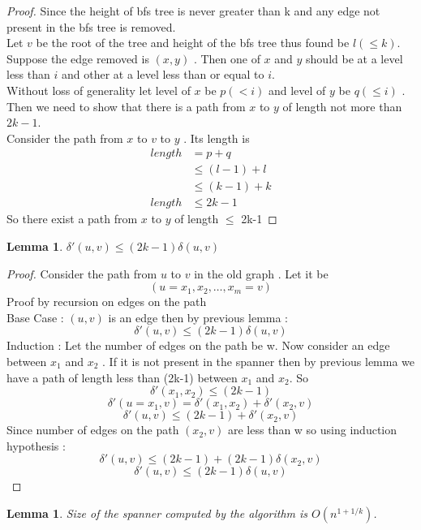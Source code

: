 \documentclass[11pt]{article}
\newtheorem{lemma}[theorem]{Lemma}
\begin{document}
\begin{proof}
Since the height of bfs tree is never greater than k and any edge not present in the bfs tree is removed. \\
Let $v$ be the root of the tree and height of the bfs tree thus found be $l (\leq k)$.	 \\
Suppose the edge removed is $(x,y)$ . Then one of $x$ and $y$ should be at a level less than $i$ and other at a level less than or equal to $i$.\\
Without loss of generality let  level of $x$ be $p(< i)$ and level of $y$ be $q(\leq i)$ .  Then we need to show that there is a path from $x$ to $y$ of length not more than $2k-1$. \\
Consider the path from $x$ to $v$ to $y$ . Its length is 
\begin{align*}
length &= p+q \\
	&\leq (l-1) + l \\
	&\leq (k-1) + k \\
length	&\leq 2k -1
\end{align*}
So there exist a path from $x$ to $y$ of length $\leq$ 2k-1
\end{proof}
\begin{lemma} $\delta'(u,v) \le (2k-1) \delta(u,v) $
\end{lemma}
\begin{proof}
Consider the path from $u$ to $v$ in the old graph . Let it be 
\[ (u=x_1 , x_2 , \ldots , x_m=v)
\]
Proof by recursion on edges on the path \\
Base Case : $(u,v)$ is an edge then by previous lemma :
\[
\delta'(u,v) \leq (2k-1) \delta(u,v) 
\]
Induction : 
Let the number of edges on the path be w.
Now consider an edge between $x_1$ and $x_2$ . If it is not present in the spanner then by previous lemma we have a path of length less than (2k-1) between $x_1$ and $x_2$.  So 
\[\delta'(x_1,x_2) \leq (2k-1)
\]
\[
\delta'(u=x_1,v) = \delta'(x_1,x_2) +   \delta'(x_{2},v)
\]
\[
\delta'(u,v) \leq (2k-1) +   \delta'(x_{2},v)
\]
Since number of edges on the path $(x_{2},v)$ are less than w so using induction hypothesis :
\[
\delta'(u,v) \leq (2k-1) +   (2k-1)\delta(x_{2},v) 
\]
\[
\delta'(u,v) \le (2k-1) \delta(u,v) 
\]



\end{proof}
\begin{lemma}
Size of the spanner computed by the algorithm is $O(n^{1+1/k})$.
\end{lemma}
\end{document}
